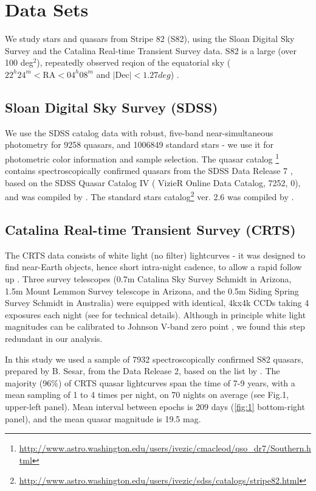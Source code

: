 \documentclass[fleqn,usenatbib]{mnras}  %
\begin{document}
\section{Data Sets}

We study stars and quasars from  Stripe 82 (S82), using the  Sloan Digital Sky Survey   and the Catalina Real-time Transient Survey data. S82 is a large (over 100 deg$^{2}$), repeatedly observed reqion of the equatorial sky ($22^{h} 24^{m} < \mathrm{RA} < 04^{h} 08^{m}$ and $\mathrm{| Dec |} < 1.27 deg$)    \citep{sesar2007, suveges2012}. 	

\subsection{Sloan Digital Sky Survey (SDSS)}
We use the SDSS catalog data with  robust,  five-band near-simultaneous  photometry for  9258  quasars,  and 1006849 standard stars - we use it for photometric color information and sample selection.  The  quasar catalog \footnote{\url{http://www.astro.washington.edu/users/ivezic/cmacleod/qso_dr7/Southern.html}} contains spectroscopically confirmed quasars from the SDSS Data Release 7 \citep{abazajian2009}, based on the SDSS Quasar  Catalog IV (\cite{schneider2008} VizieR Online Data Catalog, 7252, 0), and was compiled by \cite{macleod2011} . The standard stars catalog\footnote{\url{http://www.astro.washington.edu/users/ivezic/sdss/catalogs/stripe82.html}} ver. 2.6 was compiled by \cite{ivezic2007}.

\subsection{Catalina Real-time Transient Survey (CRTS)}
The CRTS data consists of white light (no filter) lightcurves  - it was designed to find near-Earth objects, hence short intra-night cadence, to allow a rapid follow up \citep{graham2015b} .  Three survey telescopes (0.7m Catalina Sky Survey Schmidt in Arizona,  1.5m Mount  Lemmon Survey telescope in Arizona, and the 0.5m Siding Spring Survey Schmidt in Australia) were equipped with identical, 4kx4k CCDs taking 4 exposures each night (see \cite{djorgovski2011a} for technical details).
Although in principle white light magnitudes can be calibrated to Johnson V-band zero point \citep{drake2013}, we found this step redundant in our analysis. 

In this study we used a sample of 7932 spectroscopically confirmed S82  quasars,   prepared by B. Sesar, from  the Data Release 2, based on the list by \cite{macleod2011}.  The majority (96\%) of  CRTS quasar lightcurves span the time of 7-9 years, with a mean sampling of 1 to 4 times per night,  on 70 nights on average (see Fig.1, upper-left panel).  Mean interval between epochs is 209 days (\ref{fig:1} bottom-right panel), and the mean quasar magnitude is 19.5 mag. 
\end{document}
